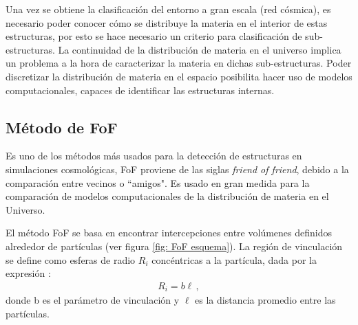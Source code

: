 Una vez se obtiene la clasificación del entorno a gran escala (red cósmica), es necesario poder conocer cómo se distribuye la materia en el interior de estas estructuras, por esto se hace necesario un criterio para clasificación de sub-estructuras. La continuidad de la distribución de materia en el universo implica un  problema a la hora de caracterizar la materia en dichas sub-estructuras. Poder discretizar la distribución de materia en el espacio posibilita hacer uso de modelos computacionales, capaces de identificar las estructuras internas.

    \subsection{Método de FoF}
    \label{subsec: FoF}

Es uno de los métodos más usados para la detección de estructuras en simulaciones cosmológicas, FoF proviene de las siglas {\it{friend of friend}}, debido a la comparación entre vecinos o ``amigos". Es usado en gran medida para la comparación de modelos computacionales de la distribución de materia en el Universo.

El método FoF se basa en 
encontrar intercepciones entre volúmenes definidos alrededor de partículas (ver figura  \ref{fig: FoF esquema}).  
La región de vinculación se define como esferas de radio $R_{i}$ concéntricas a la partícula, dada por la expresión \cite{bustamente01}:
%
\begin{align}
    R_{i}=b\ell\,,
\end{align}
%
donde b es el parámetro de vinculación y $\ell$ es la distancia promedio entre las partículas.

